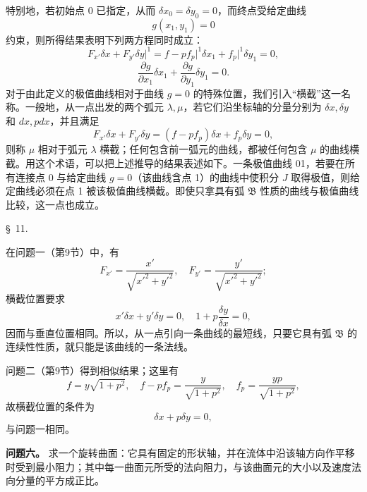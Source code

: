 \documentclass[11pt,a4paper,leqno]{article}
\begin{document}
特别地，若初始点 0 已指定，从而 $\delta x_0=\delta y_0=0$，而终点受给定曲线
\[
g(x_1,y_1)=0
\]
约束，则所得结果表明下列两方程同时成立：
\[
F_{x'}\delta x+F_{y'}\delta y\bigg|^1=f-pf_p\big|^1\delta x_1+f_p\big|^1\delta y_1=0,
\]
\[
\frac{\partial g}{\partial x_1}\delta x_1+\frac{\partial g}{\partial y_1}\delta y_1=0.
\]
对于由此定义的极值曲线相对于曲线 $g=0$ 的特殊位置，我们引入“横截”这一名称。一般地，从一点出发的两个弧元 $\lambda,\mu$，若它们沿坐标轴的分量分别为 $\delta x,\delta y$ 和 $dx,pdx$，并且满足
\[
F_{x'}\delta x+F_{y'}\delta y=(f-pf_p)\delta x+f_p\delta y=0,
\]
则称 $\mu$ 相对于弧元 $\lambda$ 横截；任何包含前一弧元的曲线，都被任何包含 $\mu$ 的曲线横截。用这个术语，可以把上述推导的结果表述如下。一条极值曲线 01，若要在所有连接点 0 与给定曲线 $g=0$（该曲线含点 1）的曲线中使积分 $J$ 取得极值，则给定曲线必须在点 1 被该极值曲线横截。即使只拿具有弧 $\mathfrak{B}$ 性质的曲线与极值曲线比较，这一点也成立。

\begin{center}{\large \S~11.}\end{center}

在问题一（第9节）中，有
\[
F_{x'}=\frac{x'}{\sqrt{x'^2+y'^2}},\quad F_{y'}=\frac{y'}{\sqrt{x'^2+y'^2}};
\]
横截位置要求
\[
x'\delta x+y'\delta y=0,\quad 1+p\frac{\delta y}{\delta x}=0,
\]
因而与垂直位置相同。所以，从一点引向一条曲线的最短线，只要它具有弧 $\mathfrak{B}$ 的连续性性质，就只能是该曲线的一条法线。

问题二（第9节）得到相似结果；这里有
\[
f=y\sqrt{1+p^2},\quad f-pf_p=\frac{y}{\sqrt{1+p^2}},\quad f_p=\frac{yp}{\sqrt{1+p^2}},
\]
故横截位置的条件为
\[
\delta x+p\delta y=0,
\]
与问题一相同。

\medskip
\noindent\textbf{问题六。} 求一个旋转曲面：它具有固定的形状轴，并在流体中沿该轴方向作平移时受到最小阻力；其中每一曲面元所受的法向阻力，与该曲面元的大小以及速度法向分量的平方成正比。
\end{document}
